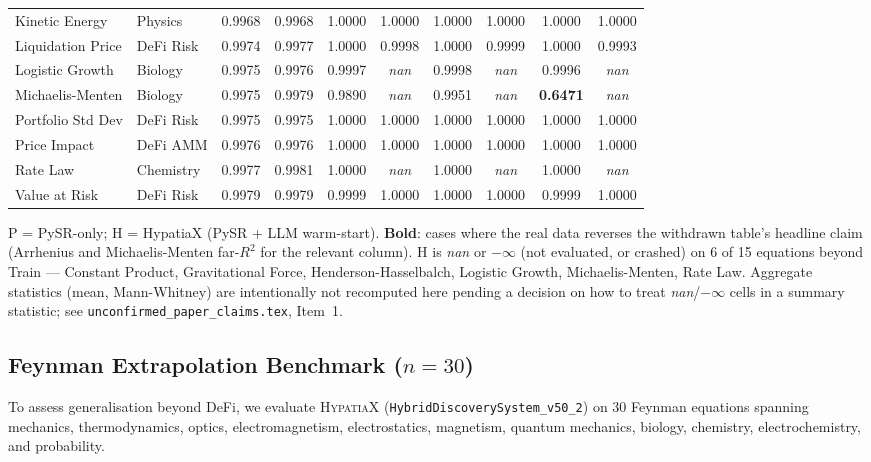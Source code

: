 \documentclass[twoside,11pt]{article}
\begin{document}
\begin{table}[htbp]
{\begin{tabular}{llcccccccc}
Kinetic Energy & Physics & 0.9968 & 0.9968 & 1.0000 & 1.0000 & 1.0000 & 1.0000 & 1.0000 & 1.0000 \\
Liquidation Price & DeFi Risk & 0.9974 & 0.9977 & 1.0000 & 0.9998 & 1.0000 & 0.9999 & 1.0000 & 0.9993 \\
Logistic Growth & Biology & 0.9975 & 0.9976 & 0.9997 & \textit{nan} & 0.9998 & \textit{nan} & 0.9996 & \textit{nan} \\
Michaelis-Menten & Biology & 0.9975 & 0.9979 & 0.9890 & \textit{nan} & 0.9951 & \textit{nan} & \textbf{0.6471} & \textit{nan} \\
Portfolio Std Dev & DeFi Risk & 0.9975 & 0.9975 & 1.0000 & 1.0000 & 1.0000 & 1.0000 & 1.0000 & 1.0000 \\
Price Impact & DeFi AMM & 0.9976 & 0.9976 & 1.0000 & 1.0000 & 1.0000 & 1.0000 & 1.0000 & 1.0000 \\
Rate Law & Chemistry & 0.9977 & 0.9981 & 1.0000 & \textit{nan} & 1.0000 & \textit{nan} & 1.0000 & \textit{nan} \\
Value at Risk & DeFi Risk & 0.9979 & 0.9979 & 0.9999 & 1.0000 & 1.0000 & 1.0000 & 0.9999 & 1.0000 \\
\bottomrule
\end{tabular}%
}%
\par\vspace{4pt}
{\footnotesize\noindent
P = PySR-only; H = HypatiaX (PySR + LLM warm-start). \textbf{Bold}: cases
where the real data reverses the withdrawn table's headline claim (Arrhenius
and Michaelis-Menten far-$R^2$ for the relevant column). H is \textit{nan}
or $-\infty$ (not evaluated, or crashed) on 6 of 15 equations beyond Train ---
Constant Product, Gravitational Force, Henderson-Hasselbalch, Logistic
Growth, Michaelis-Menten, Rate Law. Aggregate statistics (mean, Mann-Whitney)
are intentionally not recomputed here pending a decision on how to treat
\textit{nan}/$-\infty$ cells in a summary statistic; see
\texttt{unconfirmed\_paper\_claims.tex}, Item~1.
}
\end{table}

\subsection{Feynman Extrapolation Benchmark ($n=30$)}\label{subsec:feynman-extrapolation-benchmark-n30}
\label{sec:feynman30}

To assess generalisation beyond DeFi, we evaluate \textsc{HypatiaX}
(\texttt{HybridDiscoverySystem\_v50\_2}) on 30 Feynman equations spanning
mechanics, thermodynamics, optics, electromagnetism, electrostatics,
magnetism, quantum mechanics, biology, chemistry, electrochemistry, and
probability.
\end{document}
